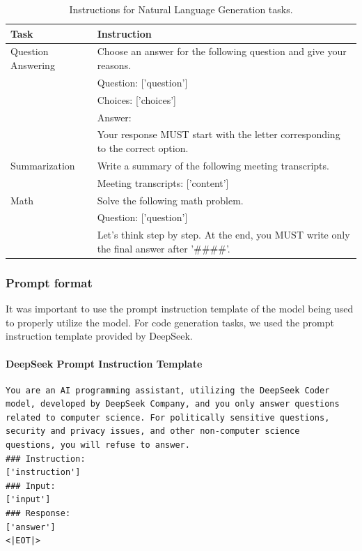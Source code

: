 \begin{table}[H] 
    \centering
    \caption{Instructions for Natural Language Generation tasks.}
    \begin{tabular}{| m{4cm} | m{9cm} |}
    \hline
    \textbf{Task} & \textbf{Instruction} \\
    \hline
    Question Answering & Choose an answer for the following question and give your reasons. \\
     & Question: ['question'] \\
     & Choices: ['choices'] \\
     & Answer: \\
     & Your response MUST start with the letter corresponding to the correct option. \\
    \hline
    Summarization & Write a summary of the following meeting transcripts. \\
     & Meeting transcripts: ['content'] \\
    \hline
    Math & Solve the following math problem. \\
     & Question: ['question'] \\
     & Let’s think step by step. At the end, you MUST write only the final answer after '\#\#\#\#'. \\
    \hline
    \end{tabular}
    \label{tab:tasks}
\end{table}


\subsubsection{Prompt format}
It was important to use the prompt instruction template of the model being used to properly utilize the model. For code generation tasks, we used the prompt instruction template provided by DeepSeek.

\paragraph{DeepSeek Prompt Instruction Template} \label{DeepSeekPrompt}
\begin{lstlisting}
You are an AI programming assistant, utilizing the DeepSeek Coder 
model, developed by DeepSeek Company, and you only answer questions 
related to computer science. For politically sensitive questions, 
security and privacy issues, and other non-computer science 
questions, you will refuse to answer.
### Instruction:
['instruction']
### Input:
['input']
### Response:
['answer']
<|EOT|>
\end{lstlisting}

